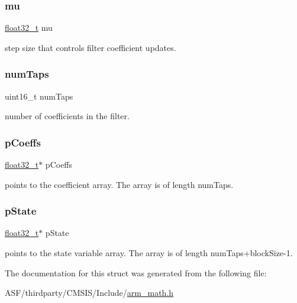 \subsubsection{\texorpdfstring{mu}{mu}}
{\footnotesize\ttfamily \mbox{\hyperlink{arm__math_8h_a4611b605e45ab401f02cab15c5e38715}{float32\+\_\+t}} mu}

step size that controls filter coefficient updates. \mbox{\label{structarm__lms__instance__f32_a751941891e47f522a7f5375fe8990aac}} 
\subsubsection{\texorpdfstring{numTaps}{numTaps}}
{\footnotesize\ttfamily uint16\+\_\+t num\+Taps}

number of coefficients in the filter. \mbox{\label{structarm__lms__instance__f32_aacbb8dd8eeba4b21fc2bb40076405ee3}} 
\subsubsection{\texorpdfstring{pCoeffs}{pCoeffs}}
{\footnotesize\ttfamily \mbox{\hyperlink{arm__math_8h_a4611b605e45ab401f02cab15c5e38715}{float32\+\_\+t}}$\ast$ p\+Coeffs}

points to the coefficient array. The array is of length num\+Taps. \mbox{\label{structarm__lms__instance__f32_a335c87e6fdc4b96601d95a5de8b9c463}} 
\subsubsection{\texorpdfstring{pState}{pState}}
{\footnotesize\ttfamily \mbox{\hyperlink{arm__math_8h_a4611b605e45ab401f02cab15c5e38715}{float32\+\_\+t}}$\ast$ p\+State}

points to the state variable array. The array is of length num\+Taps+block\+Size-\/1. 

The documentation for this struct was generated from the following file\+:\begin{DoxyCompactItemize}
\item 
A\+S\+F/thirdparty/\+C\+M\+S\+I\+S/\+Include/\mbox{\hyperlink{arm__math_8h}{arm\+\_\+math.\+h}}\end{DoxyCompactItemize}
